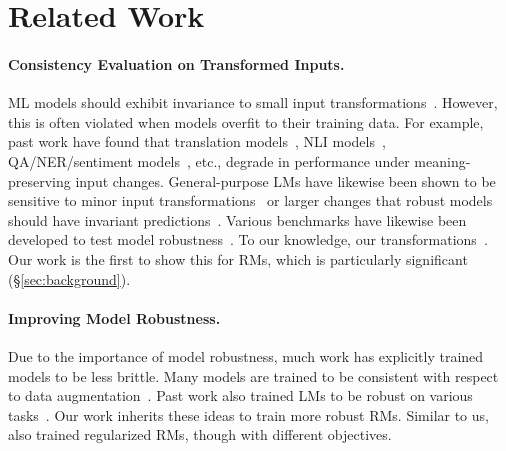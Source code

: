 \section{Related Work}

\paragraph{Consistency Evaluation on Transformed Inputs.}
ML models should exhibit invariance to small input transformations~.
However, this is often violated when models overfit to their training data.
For example, past work have found that translation models~\citep{belinkov2018synthetic}, NLI models~\citep{arakelyan-etal-2024-semantic}, QA/NER/sentiment models~\citep{Rychalska2019models}, etc., degrade in performance under meaning-preserving input changes.
General-purpose LMs have likewise been shown to be sensitive to minor input 
\iflongversion
transformations~ or larger changes that robust models should have invariant predictions~.
Various benchmarks have likewise been developed to test model robustness~.
To our knowledge, our
\else
transformations~.
Our
\fi
work is the first to show this for RMs, which is particularly significant (\S\ref{sec:background}).

\paragraph{Improving Model Robustness.}
Due to the importance of model robustness, much work has explicitly trained models to be less brittle. %
Many models are trained to be consistent with respect to data augmentation~.
Past work also trained LMs to be robust on various tasks~.
Our work inherits these ideas to train more robust RMs.
Similar to us, \citet{shen2024the} also trained regularized RMs, though with different objectives.

